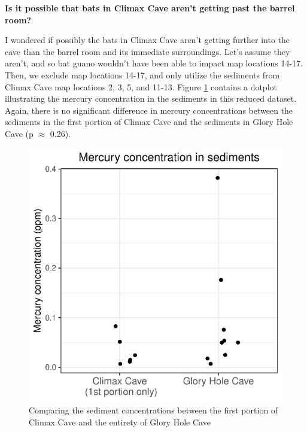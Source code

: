 \documentclass[11pt]{article}
\begin{document}
\vspace{0.2in}


\noindent \textbf{Is it possible that bats in Climax Cave aren't
  getting past the barrel room?}

I wondered if possibly the bats in Climax Cave aren't getting further
into the cave than the barrel room and its immediate surroundings.
Let's assume they aren't, and so bat guano wouldn't have been able to
impact map locations 14-17.  Then, we exclude map locations 14-17, and
only utilize the sediments from Climax Cave map locations 2, 3, 5, and
11-13.  Figure \ref{fig:dotplot_compare_sediment_reduced} contains a
dotplot illustrating the mercury concentration in the sediments in
this reduced dataset.  Again, there is no significant difference in
mercury concentrations between the sediments in the first portion of
Climax Cave and the sediments in Glory Hole Cave (p $\approx$ 0.26).
\begin{figure}[hb]
  \centering
  \includegraphics{dotplot_compare_sediment_reducedClimaxCave}
  \caption{Comparing the sediment concentrations between the first portion of Climax Cave and the entirety of Glory Hole Cave}
  \label{fig:dotplot_compare_sediment_reduced}
\end{figure}


\vspace{0.2in}
\end{document}
